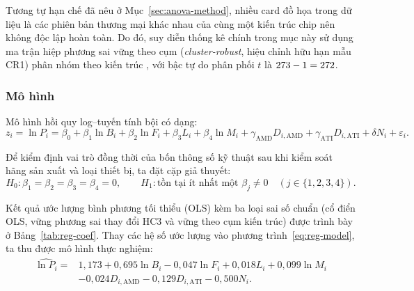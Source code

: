 Tương tự hạn chế đã nêu ở Mục~\ref{sec:anova-method}, nhiều card đồ họa trong dữ liệu là các
phiên bản thương mại khác nhau của cùng một kiến trúc chip nên không độc lập hoàn toàn. Do đó,
suy diễn thống kê chính trong mục này sử dụng ma trận hiệp phương sai vững theo cụm
(\textit{cluster-robust}, hiệu chỉnh hữu hạn mẫu CR1) phân nhóm theo \RegClusters{} kiến trúc
\cite{cameron2015}, với bậc tự do phân phối $t$ là $273 - 1 = 272$.

\subsubsection{Mô hình}
\label{sec:reg-model}

Mô hình hồi quy log--tuyến tính bội có dạng:
\begin{equation}
  z_i = \ln P_i = \beta_0 + \beta_1 \ln B_i + \beta_2 \ln F_i + \beta_3 L_i + \beta_4 \ln M_i
        + \gamma_{\mathrm{AMD}} D_{i,\mathrm{AMD}} + \gamma_{\mathrm{ATI}} D_{i,\mathrm{ATI}}
        + \delta N_i + \varepsilon_i.
  \label{eq:reg-model}
\end{equation}

Để kiểm định vai trò đồng thời của bốn thông số kỹ thuật sau khi kiểm soát hãng sản xuất và
loại thiết bị, ta đặt cặp giả thuyết:
\[
  H_0: \beta_1 = \beta_2 = \beta_3 = \beta_4 = 0, \qquad
  H_1: \text{tồn tại ít nhất một } \beta_j \ne 0 \quad (j \in \{1, 2, 3, 4\}).
\]

Kết quả ước lượng bình phương tối thiểu (OLS) kèm ba loại sai số chuẩn (cổ điển OLS, vững
phương sai thay đổi HC3 và vững theo cụm kiến trúc) được trình bày ở Bảng~\ref{tab:reg-coef}.
Thay các hệ số ước lượng vào phương trình~\eqref{eq:reg-model}, ta thu được mô hình thực nghiệm:
\begin{align*}
  \widehat{\ln P_i} ={} & 1{,}173 + 0{,}695 \ln B_i - 0{,}047 \ln F_i + 0{,}018 L_i + 0{,}099 \ln M_i \\
                        & - 0{,}024 D_{i,\mathrm{AMD}} - 0{,}129 D_{i,\mathrm{ATI}} - 0{,}500 N_i.
\end{align*}

\begin{table}[htbp]
  \centering
  \caption{Kết quả ước lượng hồi quy bội cho $\ln P$ ($n = \RegN$, \RegClusters{} cụm kiến trúc)}
  \label{tab:reg-coef}
  \small
\end{table}


